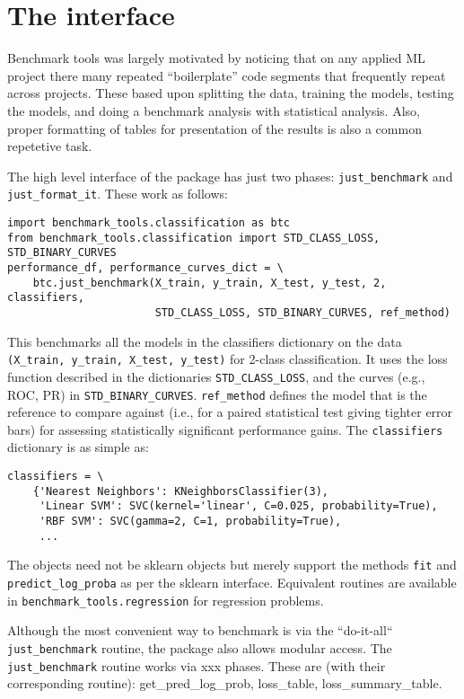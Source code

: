 \documentclass{article}
\newcommand{\code}{\texttt}
\begin{document}
\section{The interface}

Benchmark tools was largely motivated by noticing that on any applied ML project there many repeated ``boilerplate'' code segments that frequently repeat across projects.
These based upon splitting the data, training the models, testing the models, and doing a benchmark analysis with statistical analysis.
Also, proper formatting of tables for presentation of the results is also a common repetetive task.

The high level interface of the package has just two phases: \code{just\_benchmark} and \code{just\_format\_it}.
These work as follows:	
\begin{verbatim}
import benchmark_tools.classification as btc
from benchmark_tools.classification import STD_CLASS_LOSS, STD_BINARY_CURVES
performance_df, performance_curves_dict = \
    btc.just_benchmark(X_train, y_train, X_test, y_test, 2, classifiers,
                       STD_CLASS_LOSS, STD_BINARY_CURVES, ref_method)
\end{verbatim}
This benchmarks all the models in the classifiers dictionary on the data \code{(X\_train, y\_train, X\_test, y\_test)} for 2-class classification.
It uses the loss function described in the dictionaries \code{STD\_CLASS\_LOSS}, and the curves (e.g., ROC, PR) in \code{STD\_BINARY\_CURVES}.
\code{ref\_method} defines the model that is the reference to compare against (i.e., for a paired statistical test giving tighter error bars) for assessing statistically significant performance gains.
The \code{classifiers} dictionary is as simple as:
\begin{verbatim}
classifiers = \
    {'Nearest Neighbors': KNeighborsClassifier(3),
     'Linear SVM': SVC(kernel='linear', C=0.025, probability=True),
     'RBF SVM': SVC(gamma=2, C=1, probability=True),
     ...
\end{verbatim}
The objects need not be sklearn objects but merely support the methods \code{fit} and \code{predict\_log\_proba} as per the sklearn interface.
Equivalent routines are available in \code{benchmark\_tools.regression} for regression problems.

Although the most convenient way to benchmark is via the ``do-it-all`` \code{just\_benchmark} routine, the package also allows modular access.
The \code{just\_benchmark} routine works via xxx phases.
These are (with their corresponding routine): get_pred_log_prob, loss_table, loss_summary_table.
\end{document}
